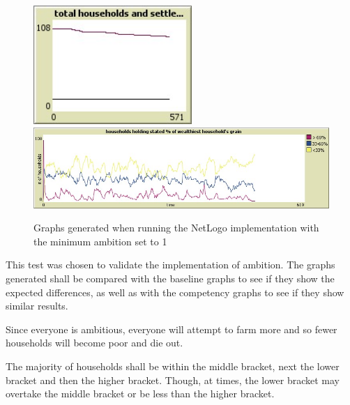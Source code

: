 \documentclass[12pt]{article}
\begin{document}
				\begin{figure}[!htb]
					\includegraphics[width=6cm]{Min_ambition_run1_C}\\
					\includegraphics[width=15cm]{Min_ambition_run1_D}
					\caption{Graphs generated when running the NetLogo implementation with the minimum ambition set to 1}
					\label{fig:Min_Ambition_Netlogo_1}
				\end{figure}
				This test was chosen to validate the implementation of ambition. The graphs generated shall be compared with the baseline graphs to see if they show the expected differences, as well as with the competency graphs to see if they show similar results.
		
				Since everyone is ambitious, everyone will attempt to farm more and so fewer households will become poor and die out.
		
				The majority of households shall be within the middle bracket, next the lower bracket and then the higher bracket. Though, at times, the lower bracket may overtake the middle bracket or be less than the higher bracket.
		
		
\end{document}

